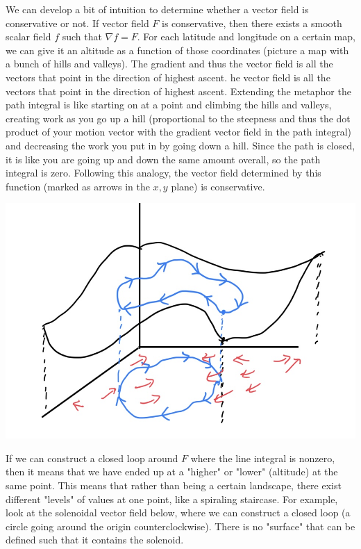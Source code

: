   We can develop a bit of intuition to determine whether a vector field is conservative or not. If vector field $F$ is conservative, then there exists a smooth scalar field $f$ such that $\nabla f = F$. For each latitude and longitude on a certain map, we can give it an altitude as a function of those coordinates (picture a map with a bunch of hills and valleys). The gradient and thus the vector field is all the vectors that point in the direction of highest ascent. he vector field is all the vectors that point in the direction of highest ascent. Extending the metaphor the path integral is like starting on at a point and climbing the hills and valleys, creating work as you go up a hill (proportional to the steepness and thus the dot product of your motion vector with the gradient vector field in the path integral) and decreasing the work you put in by going down a hill. Since the path is closed, it is like you are going up and down the same amount overall, so the path integral is zero. Following this analogy, the vector field determined by this function (marked as arrows in the $x, y$ plane) is conservative. 
  \begin{center}
      \includegraphics[scale=0.28]{img/Conservative_Vector_Field.jpg}
  \end{center}
  If we can construct a closed loop around $F$ where the line integral is nonzero, then it means that we have ended up at a "higher" or "lower" (altitude) at the same point. This means that rather than being a certain landscape, there exist different "levels" of values at one point, like a spiraling staircase. For example, look at the solenoidal vector field below, where we can construct a closed loop (a circle going around the origin counterclockwise). There is no "surface" that can be defined such that it contains the solenoid. 
